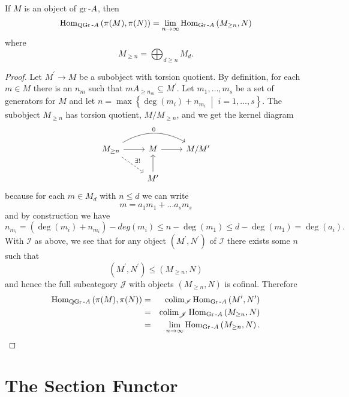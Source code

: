\documentclass[dissertation.tex]{subfiles}
\begin{document}
\begin{prop}
  If $M$ is an object of $\operatorname{gr}\text{-}A$, then 
  $$\operatorname{Hom}_{\operatorname{QGr}\text{-}A}\left(\pi(M), \pi(N)\right) = \lim_{n \rightarrow \infty} \operatorname{Hom}_{\operatorname{Gr}\text{-}A}\left(M_{\geq n}, N\right)$$
  where 
  $$M_{\geq n} = \bigoplus_{d \geq n} M_d.$$
  \begin{proof}
    Let $M^\prime \rightarrow M$ be a subobject with torsion quotient.
    By definition, for each $m \in M$ there is an $n_m$ such that $mA_{\geq n_m} \subseteq M^\prime$.
    Let $m_1, \ldots, m_s$ be a set of generators for $M$ and let $n = \max\left\{\deg(m_i) + n_{m_i} \;\middle\vert\; i = 1, \ldots , s\right\}$.
    The subobject $M_{\geq n}$ has torsion quotient, $M/M_{\geq n}$, and we get the kernel diagram
    $$\begin{tikzcd}
      M_{\geq n} \arrow[bend left]{rr}{0} \arrow[dashed]{rd}{\exists !}\arrow{r} & M \arrow{r} & M/M^\prime\\
      & M^\prime \arrow{u}
    \end{tikzcd}$$
    because for each $m \in M_{d}$ with $n \leq d$ we can write
    $$m = a_1m_1 + \ldots a_sm_s$$
    and by construction we have
    $$n_{m_i} = (\deg(m_i) + n_{m_i}) - deg(m_i) \leq n - \deg(m_1) \leq d - \deg(m_1) = \deg(a_i).$$
    With $\mathscr{I}$ as above, we see that for any object $(M^\prime, N^\prime)$ of $\mathscr{I}$ there exists some $n$ such that
    $$(M^\prime, N^\prime) \leq (M_{\geq n}, N)$$
    and hence the full subcategory $\mathscr{J}$ with objects $(M_{\geq n}, N)$ is cofinal.
    Therefore
    \begin{eqnarray*}
      \operatorname{Hom}_{\operatorname{QGr}\text{-}A}\left(\pi(M), \pi(N)\right) &=& \operatorname{colim}_{\mathscr{I}}\operatorname{Hom}_{\operatorname{Gr}\text{-}A}\left(M^\prime, N^\prime\right)\\
      &=& \operatorname{colim}_{\mathscr{J}}\operatorname{Hom}_{\operatorname{Gr}\text{-}A}\left(M_{\geq n}, N\right)\\
      &=& \lim_{n \rightarrow \infty} \operatorname{Hom}_{\operatorname{Gr}\text{-}A}\left(M_{\geq n}, N\right).
    \end{eqnarray*}
  \end{proof}
\end{prop}

\section{The Section Functor}
\end{document}
